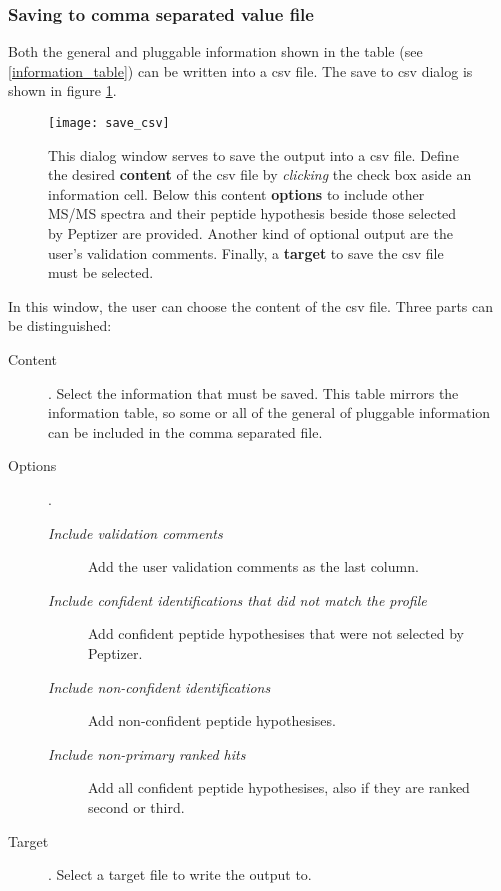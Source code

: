 \subsubsection{Saving to comma separated value file}
\label{save_csv_txt}
Both the general and pluggable information shown in the table (see \ref{information_table}) can be written into a csv file. The save to csv dialog is shown in figure \ref{save_csv}.
%
%
\begin{figure}[H]
\begin{center}
	\texttt{[image: save\_csv]}
	\caption{\label{save_csv}This dialog window serves to save the output into a csv file. Define the desired \textbf{content} of the csv file by \textit{clicking} the check box aside an information cell. Below this content \textbf{options} to include other MS/MS spectra and their peptide hypothesis beside those selected by Peptizer are provided. Another kind of optional output are the user's validation comments. Finally, a \textbf{target} to save the csv file must be selected.}
\end{center}
\end{figure}
%
%
\npar In this window, the user can choose the content of the csv file. Three parts can be distinguished:
%
\begin{description}
	\item[Content]. Select the information that must be saved. This table mirrors the information table, so some or all of the general of pluggable information can be included in the comma separated file. 
	\item[Options].\\
	\begin{description} 
		\item[\textit{Include validation comments}] Add the user validation comments as the last column.
		\item[\textit{Include confident identifications that did not match the profile}] Add confident peptide hypothesises that were not selected by Peptizer.
		\item[\textit{Include non-confident identifications}] Add non-confident peptide hypothesises.
		\item[\textit{Include non-primary ranked hits}] Add all confident peptide hypothesises, also if they are ranked second or third.
	\end{description}
	\item[Target]. Select a target file to write the output to.
\end{description}
%
%
